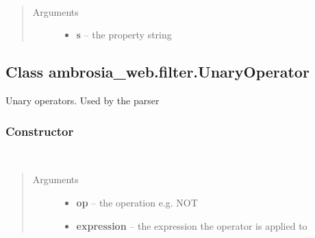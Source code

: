 \documentclass[letterpaper,10pt,english]{sphinxmanual}
\begin{document}
\begin{fulllineitems}
\label{ambrosia_web.filter.Property:ambrosia_web.filter.Property}~\begin{quote}\begin{description}
\item[{Arguments}] \leavevmode\begin{itemize}
\item {} 
\textbf{s} -- the property string

\end{itemize}

\end{description}\end{quote}

\end{fulllineitems}



\subsection{Class ambrosia\_web.filter.UnaryOperator}
\label{ambrosia_web.filter.UnaryOperator:class-ambrosia-web-filter-unaryoperator}\label{ambrosia_web.filter.UnaryOperator::doc}
Unary operators. Used by the parser


\subsubsection{Constructor}
\label{ambrosia_web.filter.UnaryOperator:constructor}

\begin{fulllineitems}
\label{ambrosia_web.filter.UnaryOperator:ambrosia_web.filter.UnaryOperator}~\begin{quote}\begin{description}
\item[{Arguments}] \leavevmode\begin{itemize}
\item {} 
\textbf{op} -- the operation e.g. NOT

\item {} 
\textbf{expression} -- the expression the operator is applied to

\end{itemize}

\end{description}\end{quote}

\end{fulllineitems}
\end{document}
